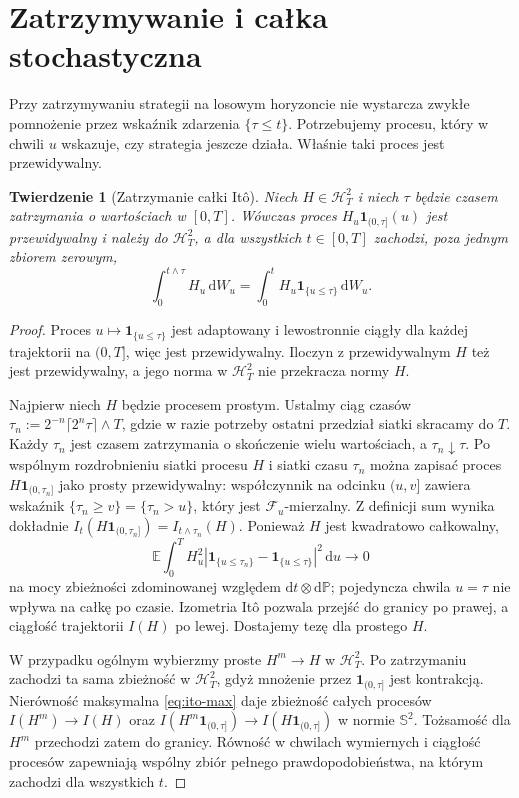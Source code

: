 \documentclass[11pt,a4paper,oneside]{report}
\numberwithin{equation}{chapter}
\theoremstyle{plain}
\newtheorem{twierdzenie}{Twierdzenie}[chapter]
\theoremstyle{definition}
\theoremstyle{remark}
\newcommand{\Prob}{\mathbb{P}}
\newcommand{\E}{\mathbb{E}}
\newcommand{\calF}{\mathcal{F}}
\newcommand{\calH}{\mathcal{H}}
\newcommand{\ind}[1]{\mathbf{1}_{#1}}
\newcommand{\dd}{\mathrm{d}}
\begin{document}
\section{Zatrzymywanie i całka stochastyczna}\label{sec:volIII:02:05}
Przy zatrzymywaniu strategii na losowym horyzoncie nie
wystarcza zwykłe pomnożenie przez wskaźnik zdarzenia
$\{\tau\le t\}$. Potrzebujemy procesu, który w chwili $u$
wskazuje, czy strategia jeszcze działa. Właśnie taki proces
jest przewidywalny.

\begin{twierdzenie}[Zatrzymanie całki Itô]\label{thm:volIII:02:05}\label{th:ito-stopping}
Niech $H\in\calH_T^2$ i niech $\tau$ będzie czasem
zatrzymania o wartościach w $[0,T]$. Wówczas proces
$H_u\ind{(0,\tau]}(u)$ jest przewidywalny i należy
do $\calH_T^2$, a dla wszystkich $t\in[0,T]$
zachodzi, poza jednym zbiorem zerowym,
\[
\int_0^{t\wedge\tau}H_u\,\dd W_u
=\int_0^t H_u\ind{\{u\le\tau\}}\,\dd W_u.
\tag{2.11}\label{eq:stopped-ito}
\]
\end{twierdzenie}
\begin{proof}
Proces $u\mapsto\ind{\{u\le\tau\}}$ jest adaptowany
i lewostronnie ciągły dla każdej trajektorii na $(0,T]$,
więc jest przewidywalny. Iloczyn z przewidywalnym $H$
też jest przewidywalny, a jego norma w $\calH_T^2$
nie przekracza normy $H$.

Najpierw niech $H$ będzie procesem prostym. Ustalmy
ciąg czasów $\tau_n:=2^{-n}\lceil2^n\tau\rceil\wedge T$,
gdzie w razie potrzeby ostatni przedział siatki skracamy
do $T$. Każdy $\tau_n$ jest czasem zatrzymania o skończenie
wielu wartościach, a $\tau_n\downarrow\tau$.
Po wspólnym rozdrobnieniu siatki procesu $H$ i siatki
czasu $\tau_n$ można zapisać proces
$H\ind{(0,\tau_n]}$ jako prosty przewidywalny:
współczynnik na odcinku $(u,v]$ zawiera wskaźnik
$\{\tau_n\ge v\}=\{\tau_n>u\}$, który jest
$\calF_u$-mierzalny. Z definicji sum wynika dokładnie
$I_t(H\ind{(0,\tau_n]})=I_{t\wedge\tau_n}(H)$.
Ponieważ $H$ jest kwadratowo całkowalny,
\[
\E\int_0^T H_u^2
|\ind{\{u\le\tau_n\}}-\ind{\{u\le\tau\}}|^2\,\dd u
\longrightarrow0
\]
na mocy zbieżności zdominowanej względem
$\dd t\otimes\dd\Prob$; pojedyncza chwila $u=\tau$
nie wpływa na całkę po czasie. Izometria Itô pozwala
przejść do granicy po prawej, a ciągłość trajektorii
$I(H)$ po lewej. Dostajemy tezę dla prostego $H$.

W przypadku ogólnym wybierzmy proste $H^m\to H$
w $\calH_T^2$. Po zatrzymaniu zachodzi ta sama
zbieżność w $\calH_T^2$, gdyż mnożenie przez
$\ind{(0,\tau]}$ jest kontrakcją.
Nierówność maksymalna \eqref{eq:ito-max} daje zbieżność
całych procesów $I(H^m)\to I(H)$ oraz
$I(H^m\ind{(0,\tau]})\to I(H\ind{(0,\tau]})$
w normie $\mathbb S^2$. Tożsamość dla $H^m$
przechodzi zatem do granicy. Równość w chwilach wymiernych
i ciągłość procesów zapewniają wspólny zbiór pełnego
prawdopodobieństwa, na którym zachodzi dla wszystkich $t$.
\end{proof}
\end{document}
